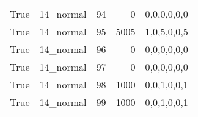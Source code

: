 \begin{tabular}{llrrl}
 True            & 14\_normal           &            94 &                     0 & 0,0,0,0,0,0   \\
 True            & 14\_normal           &            95 &                  5005 & 1,0,5,0,0,5   \\
 True            & 14\_normal           &            96 &                     0 & 0,0,0,0,0,0   \\
 True            & 14\_normal           &            97 &                     0 & 0,0,0,0,0,0   \\
 True            & 14\_normal           &            98 &                  1000 & 0,0,1,0,0,1   \\
 True            & 14\_normal           &            99 &                  1000 & 0,0,1,0,0,1   \\
\hline
\end{tabular}